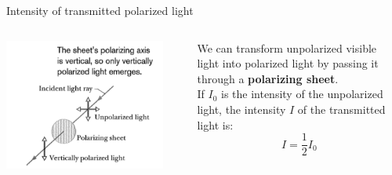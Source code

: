 %
%
%

\begin{frame}{Intensity of transmitted polarized light}

\begin{columns}
  \begin{column}{0.40\textwidth}
    \begin{center}
       \includegraphics[width=0.90\textwidth]{./images/schematics/unpolarized_light_sent_through_filter.png}\\
    \end{center}
  \end{column}
  \begin{column}{0.60\textwidth}
      We can transform unpolarized visible light into polarized light by passing
      it through a {\bf polarizing sheet}.\\
      \vspace{0.2cm}
      If $I_0$ is the intensity of the unpolarized light,
      the intensity $I$ of the transmitted light is:
      \begin{equation*}
        I = \frac{1}{2}I_0
      \end{equation*}
  \end{column}
\end{columns}


\end{frame}
